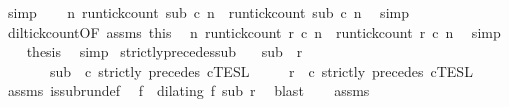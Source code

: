 \begin{isabellebody}
\ simp\isanewline
\ \ \isamarkupfalse%
\ {\isacartoucheopen}{\isasymforall}n{\isachardot}\ {\isacharparenleft}run{\isacharunderscore}tick{\isacharunderscore}count\ sub\ c\ n{\isacharparenright}\ {\isasymle}\ {\isacharparenleft}run{\isacharunderscore}tick{\isacharunderscore}count\ sub\ c\ n{\isacharparenright}{\isacartoucheclose}\ \isamarkupfalse%
\ simp\isanewline
\ \ \isamarkupfalse%
\ dil{\isacharunderscore}tick{\isacharunderscore}count{\isacharbrackleft}OF\ assms{\isacharparenleft}{}{\isacharparenright}\ this{\isacharbrackright}\ \isamarkupfalse%
\ {\isacartoucheopen}{\isasymforall}n{\isachardot}\ {\isacharparenleft}run{\isacharunderscore}tick{\isacharunderscore}count\ r\ c\ n{\isacharparenright}\ {\isasymle}\ {\isacharparenleft}run{\isacharunderscore}tick{\isacharunderscore}count\ r\ c\ n{\isacharparenright}{\isacartoucheclose}\ \isamarkupfalse%
\ simp\isanewline
\ \ \isamarkupfalse%
\ {\isacharquery}thesis\ \isamarkupfalse%
\ simp\isanewline
{}\isamarkupfalse%
%
\endisatagproof
{\isafoldproof}%
%
\isadelimproof
\isanewline
%
\endisadelimproof
\isanewline
{}\isamarkupfalse%
\ strictly{\isacharunderscore}precedes{\isacharunderscore}sub{}{\isacharcolon}\isanewline
\ \ \ {\isacartoucheopen}sub\ {\isasymlless}\ r{\isacartoucheclose}\isanewline
\ \ \ \ \ \ \ {\isacartoucheopen}sub\ {\isasymin}\ {\isasymlbrakk}c\ strictly\ precedes\ c\isactrlsub T\isactrlsub E\isactrlsub S\isactrlsub L{\isacartoucheclose}\isanewline
\ \ \ \ \ {\isacartoucheopen}r\ {\isasymin}\ {\isasymlbrakk}c\ strictly\ precedes\ c\isactrlsub T\isactrlsub E\isactrlsub S\isactrlsub L{\isacartoucheclose}\isanewline
%
\isadelimproof
%
\endisadelimproof
%
\isatagproof
{}\isamarkupfalse%
\ {\isacharminus}\isanewline
\ \ \isamarkupfalse%
\ assms{\isacharparenleft}{}{\isacharparenright}\ is{\isacharunderscore}subrun{\isacharunderscore}def\ \isamarkupfalse%
\ f\ \ {\isacharasterisk}{\isacharcolon}{\isacartoucheopen}dilating\ f\ sub\ r{\isacartoucheclose}\ \isamarkupfalse%
\ blast\isanewline
\ \ \isamarkupfalse%
\ assms{\isacharparenleft}{}{\isacharparenright}\ \isamarkupfalse%

\end{isabellebody}
